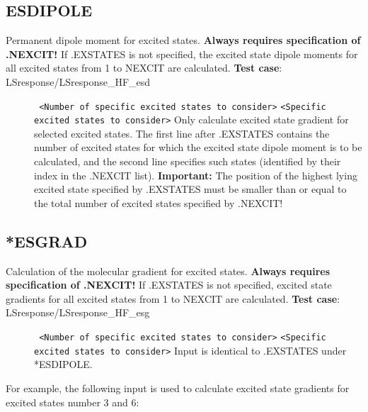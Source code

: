 \subsection*{ESDIPOLE}\label{subsec:esd}
Permanent dipole moment for excited states. 
{\bf Always requires specification of .NEXCIT!}\newline
If .EXSTATES is not specified, the excited state dipole moments
for all excited states from 1 to NEXCIT
are calculated. \newline
{\bf Test case}: LSresponse/LSresponse\_HF\_esd
\begin{description}
\item[] \verb| | \newline
\verb|<Number of specific excited states to consider>|\newline
\verb|<Specific excited states to consider>|\newline
Only calculate excited state gradient for selected excited states.
The first line after .EXSTATES contains the number
of excited states for which the 
excited state dipole moment
is to be calculated,
and the second line specifies such states (identified by their 
index in the .NEXCIT list).
{\bf Important:} The position of the highest lying excited state
specified by .EXSTATES must be smaller than or equal to
the total number of excited states specified by .NEXCIT!
\end{description}

\subsection{*ESGRAD}\label{subsec:esg}
Calculation of the molecular gradient for excited states.
{\bf Always requires specification of .NEXCIT!}
If .EXSTATES is not specified, excited state gradients
for all excited states from 1 to NEXCIT
are calculated. \newline
{\bf Test case}: LSresponse/LSresponse\_HF\_esg 
\begin{description}
\item[] \verb| | \newline
\verb|<Number of specific excited states to consider>|\newline
\verb|<Specific excited states to consider>|\newline
Input is identical to .EXSTATES under *ESDIPOLE.
\end{description}
For example, the following input is used 
to calculate excited state gradients for excited states number 3 and 6:
\begin{description}
\item[]
\item[]
\item[]
\item[]
\item[]
\item[]
\item[]
\end{description}



